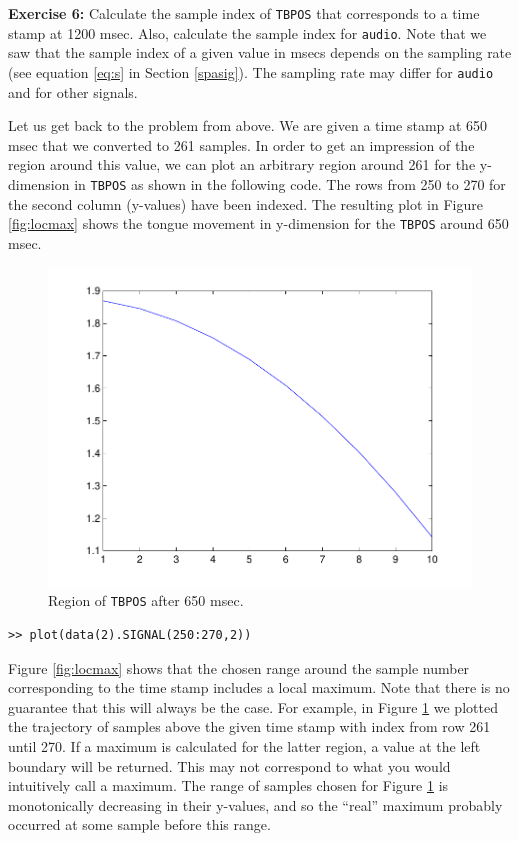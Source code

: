 \documentclass[a4paper, 12pt]{article}
\begin{document}
\noindent\textbf{Exercise 6:} Calculate the sample index of \texttt{TBPOS} that corresponds to a time stamp at 1200 msec. Also, calculate the sample index for \texttt{audio}. Note that we saw that the sample index of a given value in msecs depends on the sampling rate (see equation \eqref{eq:s} in Section \ref{spasig}). The sampling rate may differ for \texttt{audio} and for other signals.\par\smallskip


Let us get back to the problem from above. We are given a time stamp at 650 msec that we converted to 261 samples. In order to get an impression of the region around this value, we can plot an arbitrary region around 261 for the y-dimension in \texttt{TBPOS} as shown in the following code. The rows from 250 to 270 for the second column (y-values) have been indexed. The resulting plot in Figure \ref{fig:locmax} shows the tongue movement in y-dimension for the \texttt{TBPOS} around 650 msec.

\begin{figure}
\includegraphics[scale=0.45]{increase.pdf}%
\caption{Region of \texttt{TBPOS} after 650 msec.}\label{fig:increase}
\end{figure}


\begin{verbatim}
>> plot(data(2).SIGNAL(250:270,2))
\end{verbatim}

Figure \ref{fig:locmax} shows that the chosen range around the sample number corresponding to the time stamp includes a local maximum. Note that there is no guarantee that this will always be the case. For example, in Figure \ref{fig:increase} we plotted the trajectory of samples above the given time stamp with index from row 261 until 270. If a maximum is calculated for the latter region, a value at the left boundary will be returned. This may not correspond to what you would intuitively call a maximum. The range of samples chosen for Figure \ref{fig:increase} is monotonically decreasing in their y-values, and so the ``real'' maximum probably occurred at some sample before this range. 
\end{document}
